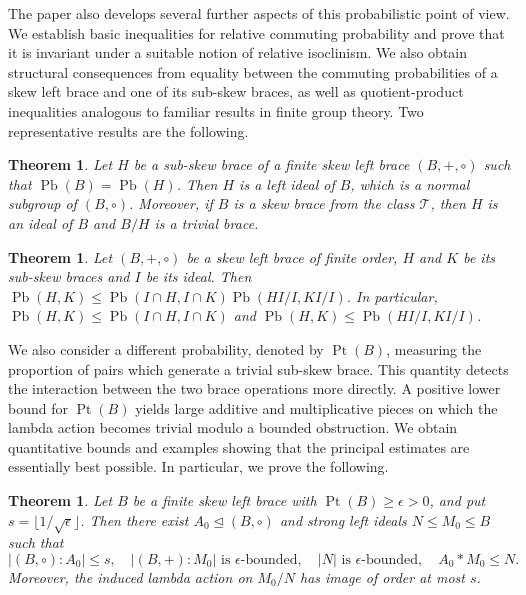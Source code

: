 \documentclass[10pt,a4paper]{amsart}
\numberwithin{equation}{section}
\newtheorem{thm}[equation]{Theorem}
\newcommand{\Pb}{\operatorname{Pb} }
\newcommand{\Pt}{\operatorname{Pt} }
\begin{document}
The paper also develops several further aspects of this probabilistic point of view. We establish basic inequalities for relative commuting probability and prove that it is invariant under a suitable notion of relative isoclinism. We also obtain structural consequences from equality between the commuting probabilities of a skew left brace and one of its sub-skew braces, as well as quotient-product inequalities analogous to familiar results in finite group theory. Two representative results are the following.

\begin{thm} %
Let $H$ be a sub-skew brace of a finite skew left brace $(B, +, \circ)$ such that $\Pb(B)=\Pb(H)$. Then $H$ is a left ideal of $B$, which is a normal subgroup of $(B,\circ)$. Moreover, if $B$ is a skew brace from the class $\mathcal{T}$, then $H$ is an ideal of $B$ and $B/H$ is a trivial brace.
\end{thm}

\begin{thm} %
Let $(B,+, \circ)$ be a skew left brace of finite order, $H$ and $K$ be its sub-skew braces and $I$ be its ideal. Then $\Pb(H,K)\leqslant \Pb(I\cap H, I\cap K)\Pb(HI/I,KI/I)$. In particular, $\Pb(H,K)\leqslant \Pb(I\cap H, I\cap K)$ and $\Pb(H,K) \leqslant \Pb(HI/I,KI/I)$.
\end{thm}

We also consider a different probability, denoted by $\Pt(B)$, measuring the proportion of pairs which generate a trivial sub-skew brace. This quantity detects the interaction between the two brace operations more directly. A positive lower bound for $\Pt(B)$ yields large additive and multiplicative pieces on which the lambda action becomes trivial modulo a bounded obstruction. We obtain quantitative bounds and examples showing that the principal estimates are essentially best possible. In particular, we prove the following.

\begin{thm} %
Let $B$ be a finite skew left brace with $\Pt(B)\geqslant\epsilon>0$, and put
$s=\lfloor1/\sqrt{\epsilon}\rfloor$. Then there exist
$A_0\unlhd(B,\circ)$ and strong left ideals $N\leqslant M_0\leqslant B$
such that
$$
|(B,\circ):A_0|\leqslant s,\quad
|(B,+):M_0|\text{ is $\epsilon$-bounded},\quad
|N|\text{ is $\epsilon$-bounded},\quad
A_0*M_0\leqslant N.
$$
Moreover, the induced lambda action on $M_0/N$ has image of order at most $s$.
\end{thm}
\end{document}
